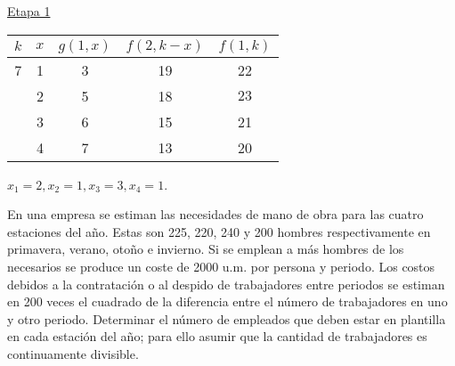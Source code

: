 \documentclass[twoside]{article}
\begin{document}
\begin{ejercicio}{4}
\begin{solucion}
\underline{Etapa 1}
\begin{center}
\begin{tabular}{|c|c|c|c|c|}
\hline
$k$ & $x$ & $g(1,x)$ & $f(2,k-x)$ & $f(1,k)$\\
\hline
7 & 1 & 3 & 19 & 22\\
  & 2 & 5 & 18 & $\boxed{23}$\\
  & 3 & 6 & 15 & 21\\
  & 4 & 7 & 13 & 20\\
  \hline
\end{tabular}
\end{center}
$x_1=2, x_2=1, x_3=3, x_4=1$.
\end{solucion}
\end{ejercicio}

\newpage 
\begin{ejercicio}{5}
En una empresa se estiman las necesidades de mano de obra para las cuatro estaciones del año.
Estas son 225, 220, 240 y 200 hombres respectivamente en primavera, verano, otoño e invierno.
Si se emplean a más hombres de los necesarios se produce un coste de 2000 u.m. por persona
y periodo. Los costos debidos a la contratación o al despido de trabajadores entre periodos se
estiman en 200 veces el cuadrado de la diferencia entre el número de trabajadores en uno y otro
periodo.
Determinar el número de empleados que deben estar en plantilla en cada estación del año; para
ello asumir que la cantidad de trabajadores es continuamente divisible.
\begin{solucion}
\end{solucion}
\end{ejercicio}
\end{document}
